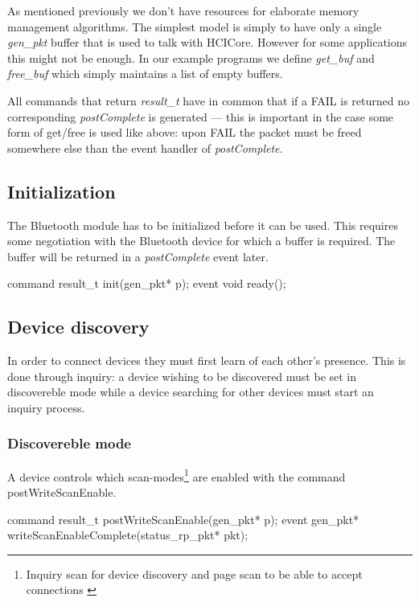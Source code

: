 \documentclass[a4paper,10pt]{article}
\begin{document}
As mentioned previously we don't have resources for elaborate memory
management algorithms. The simplest model is simply to have only a
single \emph{gen\_pkt} buffer that is used to talk with HCICore.
However for some applications this might not be enough. In our example
programs we define \emph{get\_buf} and \emph{free\_buf} which simply
maintains a list of empty buffers.

All commands that return \emph{result\_t} have in common that if a
FAIL is returned no corresponding \emph{postComplete} is generated ---
this is important in the case some form of get/free is used like
above: upon FAIL the packet must be freed somewhere else than the
event handler of \emph{postComplete}.

\subsection{Initialization}
The Bluetooth module has to be initialized before it can be used. This
requires some negotiation with the Bluetooth device for which a buffer
is required. The buffer will be returned in a \emph{postComplete}
event later.

\begin{boxedverbatim}
command result_t init(gen_pkt* p);
event void ready();
\end{boxedverbatim}

\subsection{Device discovery}
In order to connect devices they must first learn of each other's
presence. This is done through inquiry: a device wishing to be
discovered must be set in discovereble mode while a device searching
for other devices must start an inquiry process.

\subsubsection{Discovereble mode}
A device controls which scan-modes\footnote{Inquiry scan for device
  discovery and page scan to be able to accept connections
  \cite{BT02}} are enabled with the command postWriteScanEnable.

\begin{boxedverbatim}
command result_t postWriteScanEnable(gen_pkt* p);
event gen_pkt* writeScanEnableComplete(status_rp_pkt* pkt);
\end{boxedverbatim}
\end{document}
